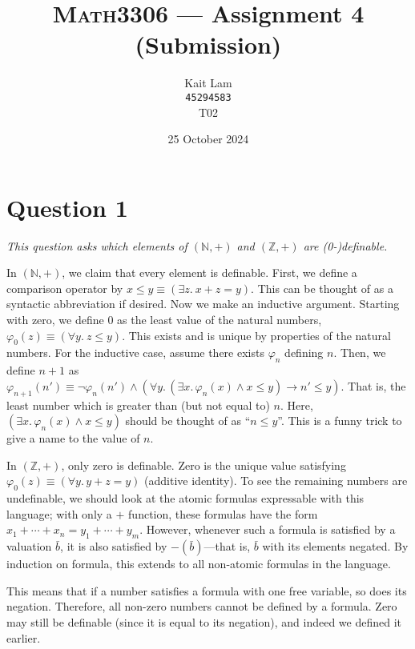 \documentclass[a4paper]{article}
\author{Kait Lam \\ \small \texttt{45294583} \\ \small {T02}}
\title{\textsc{Math3306} --- Assignment 4 (Submission)}
\date{25 October 2024}
\begin{document}
\maketitle


\section*{Question 1}
\begin{center}
  \textit{This question asks which elements of $(\mathbb N, +)$ and $(\mathbb Z, +)$ are (0-)definable.}
\end{center}
In $(\mathbb N, +)$, we claim that every element is definable.
First, we define a comparison operator by
$x \le y \equiv (\exists z.~ x + z = y)$.
This can be thought of as a syntactic abbreviation if desired.
Now we make an inductive argument.
Starting with zero, we define 0 as the 
least value of the natural numbers,
$\varphi_0(z) \equiv (\forall y.~ z \le y)$.
This exists and is unique by properties of the natural numbers.
For the inductive case, assume 
there exists $\varphi_n$ defining $n$.
Then, we define $n+1$
as $\varphi_{n+1}(n') \equiv \neg \varphi_n(n')  \wedge (\forall y.\,(\exists x. \,\varphi_n(x)\wedge x \le y) \longrightarrow n' \le y)$.
That is, the least number which is greater than (but not equal to) $n$.
Here, 
$(\exists x. \,\varphi_n(x)\wedge x \le y)$
should be thought of as ``$n \le y$''.
This is a funny trick to give a name to the
value of $n$.

In $(\mathbb Z, +)$, only zero is definable.
Zero is the unique value satisfying 
$\varphi_0(z) \equiv (\forall y. \,y + z = y)$ (additive identity).
To see the remaining numbers are undefinable, we should look at the atomic
formulas expressable with this language;
with only a $+$ function, these formulas have the form
$x_1 + \cdots + x_n = y_1 + \cdots + y_m$.
However, whenever such a formula is satisfied by a valuation $\bar b$,
it is also satisfied by $-(\bar b)$---that is, $\bar b$
with its elements negated.
By induction on formula, this extends to all non-atomic formulas in the language.

This means that if a number satisfies a formula with one free variable,
so does its negation.
Therefore, all non-zero numbers cannot be defined by a formula.
Zero may still be definable (since it is equal to its negation),
and indeed we defined it earlier.
\end{document}
